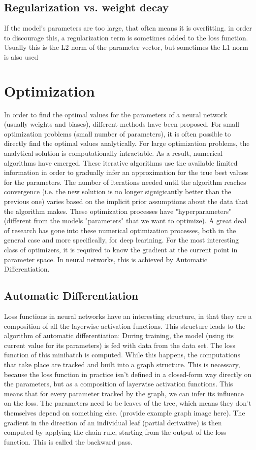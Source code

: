 \documentclass[twoside,12pt,a4paper]{report}
\begin{document}
\subsection{Regularization vs. weight decay}
If the model's parameters are too large, that often means it is overfitting. in order to discourage this, a regularization term is sometimes added to the loss function. Usually this is the L2 norm of the parameter vector, but sometimes the L1 norm is also used

\section{Optimization}
In order to find the optimal values for the parameters of a neural network (usually weights and biases), different methods have been proposed. For small optimization problems (small number of parameters), it is often possible to directly find the optimal values analytically. For large optimization problems, the analytical solution is computationally intractable. As a result, numerical algorithms have emerged. These iterative algorithms use the available limited information in order to gradually infer an approximation for the true best values for the parameters. The number of iterations needed until the algorithm reaches convergence (i.e. the new solution is no longer signigicantly better than the previous one) varies based on the implicit prior assumptions about the data that the algorithm makes. These optimization processes have "hyperparameters" (different from the models "parameters" that we want to optimize). A great deal of research has gone into these numerical optimization processes, both in the general case and more specifically, for deep learining.
For the most interesting class of optimizers, it is required to know the gradient at the current point in parameter space. In neural networks, this is achieved by Automatic Differentiation.

\subsection{Automatic Differentiation}
Loss functions in neural networks have an interesting structure, in that they are a composition of all the layerwise activation functions. This structure leads to the algorithm of automatic differentiation:
During training, the model (using its current value for its parameters) is fed with data from the data set. The loss function of this minibatch is computed. While this happens, the computations that take place are tracked and built into a graph structure. This is necessary, because the loss function in practice isn't defined in a closed-form way directly on the parameters, but as a composition of layerwise activation functions. This means that for every parameter tracked by the graph, we can infer its influence on the loss. The parameters need to be leaves of the tree, which means they don't themselves depend on something else. (provide example graph image here).
The gradient in the direction of an individual leaf (partial derivative) is then computed by applying the chain rule, starting from the output of the loss function. This is called the backward pass.
\end{document}
